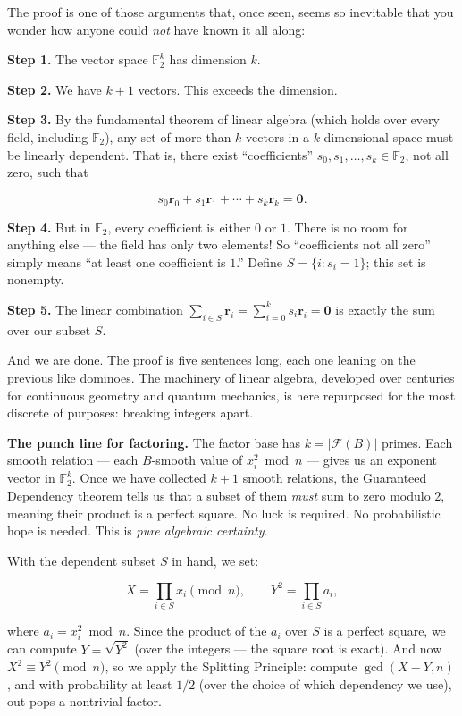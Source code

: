 The proof is one of those arguments that, once seen, seems so inevitable that you wonder how anyone could \emph{not} have known it all along:

\textbf{Step 1.} The vector space \(\mathbb{F}_2^k\) has dimension \(k\).

\textbf{Step 2.} We have \(k + 1\) vectors. This exceeds the dimension.

\textbf{Step 3.} By the fundamental theorem of linear algebra (which holds over every field, including \(\mathbb{F}_2\)), any set of more than \(k\) vectors in a \(k\)-dimensional space must be linearly dependent. That is, there exist ``coefficients'' \(s_0, s_1, \ldots, s_k \in \mathbb{F}_2\), not all zero, such that

\[s_0 \mathbf{r}_0 + s_1 \mathbf{r}_1 + \cdots + s_k \mathbf{r}_k = \mathbf{0}.\]

\textbf{Step 4.} But in \(\mathbb{F}_2\), every coefficient is either \(0\) or \(1\). There is no room for anything else --- the field has only two elements! So ``coefficients not all zero'' simply means ``at least one coefficient is \(1\).'' Define \(S = \{i : s_i = 1\}\); this set is nonempty.

\textbf{Step 5.} The linear combination \(\sum_{i \in S} \mathbf{r}_i = \sum_{i=0}^k s_i \mathbf{r}_i = \mathbf{0}\) is exactly the sum over our subset \(S\).

And we are done. The proof is five sentences long, each one leaning on the previous like dominoes. The machinery of linear algebra, developed over centuries for continuous geometry and quantum mechanics, is here repurposed for the most discrete of purposes: breaking integers apart.

\textbf{The punch line for factoring.} The factor base has \(k = |\mathcal{F}(B)|\) primes. Each smooth relation --- each \(B\)-smooth value of \(x_i^2 \bmod n\) --- gives us an exponent vector in \(\mathbb{F}_2^k\). Once we have collected \(k + 1\) smooth relations, the Guaranteed Dependency theorem tells us that a subset of them \emph{must} sum to zero modulo \(2\), meaning their product is a perfect square. No luck is required. No probabilistic hope is needed. This is \emph{pure algebraic certainty}.

With the dependent subset \(S\) in hand, we set:

\[X = \prod_{i \in S} x_i \pmod{n}, \qquad Y^2 = \prod_{i \in S} a_i,\]

where \(a_i = x_i^2 \bmod n\). Since the product of the \(a_i\) over \(S\) is a perfect square, we can compute \(Y = \sqrt{Y^2}\) (over the integers --- the square root is exact). And now \(X^2 \equiv Y^2 \pmod{n}\), so we apply the Splitting Principle: compute \(\gcd(X - Y, n)\), and with probability at least \(1/2\) (over the choice of which dependency we use), out pops a nontrivial factor.


